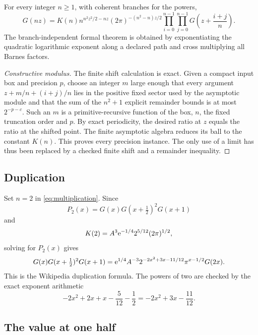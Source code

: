 \begin{theorem}\label{thm:multiplication}
For every integer \(n\ge1\), with coherent branches for the powers,
\begin{equation}\label{eq:multiplication}
 G(nz)=K(n)n^{n^2z^2/2-nz}
 (2\pi)^{-(n^2-n)z/2}
 \prod_{i=0}^{n-1}\prod_{j=0}^{n-1}
 G\left(z+\frac{i+j}{n}\right).
\end{equation}
The branch-independent formal theorem is obtained by exponentiating the
quadratic logarithmic exponent along a declared path and cross multiplying all
Barnes factors.
\end{theorem}

\begin{proof}[Constructive modulus]
The finite shift calculation is exact.  Given a compact input box and precision
\(p\), choose an integer \(m\) large enough that every argument
\(z+m/n+(i+j)/n\) lies in the positive fixed sector used by the asymptotic
module and that the sum of the \(n^2+1\) explicit remainder bounds is at most
\(2^{-p-c}\).  Such an \(m\) is a primitive-recursive function of the box,
\(n\), the fixed truncation order and \(p\).  By exact periodicity, the desired
ratio at \(z\) equals the ratio at the shifted point.  The finite asymptotic
algebra reduces its ball to the constant \(K(n)\).  This proves every precision
instance.  The only use of a limit has thus been replaced by a checked finite
shift and a remainder inequality.
\end{proof}

\subsection{Duplication}

Set \(n=2\) in \cref{eq:multiplication}.  Since
\[
 P_2(x)=G(x)G(x+\tfrac12)^2G(x+1)
\]
and
\[
 K(2)=A^3\mathrm e^{-1/4}2^{5/12}(2\pi)^{1/2},
\]
solving for \(P_2(x)\) gives
\begin{equation}\label{eq:duplication}
 G(x)G(x+\tfrac12)^2G(x+1)
 =\mathrm e^{1/4}A^{-3}
 2^{-2x^2+3x-11/12}\pi^{x-1/2}G(2x).
\end{equation}
This is the Wikipedia duplication formula.  The powers of two are checked by
the exact exponent arithmetic
\[
 -2x^2+2x+x-\frac{5}{12}-\frac12
 =-2x^2+3x-\frac{11}{12}.
\]

\subsection{The value at one half}

